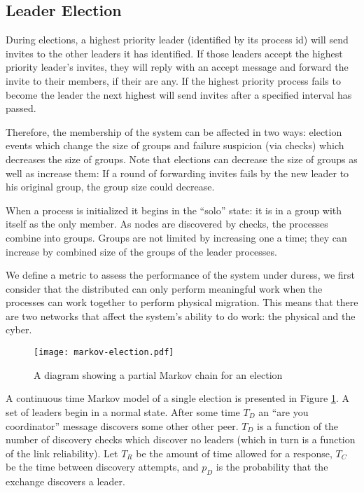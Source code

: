 \subsection{Leader Election}

During elections, a highest priority leader (identified by its process id) will 
send invites to the other leaders it has identified. If those leaders accept 
the highest priority leader's invites, they will reply with an accept message 
and forward the invite to their members, if their are any. If the highest 
priority process fails to become the leader the next highest will send invites 
after a specified interval has passed.

Therefore, the membership of the system can be affected in two ways: election 
events which change the size of groups and failure suspicion (via checks) which 
decreases the size of groups. Note that elections can decrease the size of 
groups as well as increase them: If a round of forwarding invites fails by the 
new leader to his original group, the group size could decrease.

When a process is initialized it begins in the ``solo'' state: it is in a group 
with itself as the only member. As nodes are discovered by checks, the 
processes combine into groups. Groups are not limited by increasing one a time; 
they can increase by combined size of the groups of the leader processes.

We define a metric to assess the performance of the system under duress, we 
first consider that the distributed can only perform meaningful work when the 
processes can work together to perform physical migration. This means that 
there are two networks that affect the system's ability to do work: the 
physical and the cyber.

\begin{figure}[!h]
\centering
\texttt{[image: markov-election.pdf]}
\captionsetup{singlelinecheck=off}
\caption{A diagram showing a partial Markov chain for an election}
\label{fig:MARKOVELECTION}
\end{figure}

A continuous time Markov model of a single election is presented in Figure \ref{fig:MARKOVELECTION}.
A set of leaders begin in a normal state. After some time $T_{D}$ an ``are you coordinator''
message discovers some other other peer. $T_{D}$ is a function of the number of discovery
checks which discover no leaders (which in turn is a function of the link reliability). Let
$T_{R}$ be the amount of time allowed for a response, $T_{C}$ be the time between
discovery attempts, and $p_{D}$ is the probability that the exchange discovers a leader.

